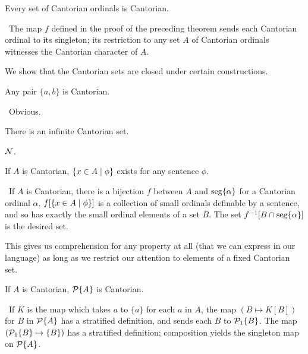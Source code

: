 \begin{thm}
 Every set of Cantorian ordinals is Cantorian.
\end{thm}

\preuve\ The map $f$ defined in the proof of the preceding
theorem sends each Cantorian ordinal to its
singleton; its restriction to any set $A$ of Cantorian
ordinals witnesses the Cantorian
character of $A$.
\finpreuve

We show that the Cantorian sets are closed under certain
constructions.

\begin{thm}
 Any pair $\{a,b\}$ is Cantorian.
\end{thm}

\preuve\ Obvious.
\finpreuve

\begin{thm}
 There is an infinite Cantorian set.
\end{thm}

\preuve ${\cal N}$.
\finpreuve

\begin{thm}
 If $A$ is Cantorian, $\{x \in A \mid \phi\}$ exists for any sentence $\phi$.
\end{thm}

\preuve\ If $A$ is Cantorian, there is a bijection $f$
between $A$ and $\mathop{\mathrm{seg}}\{\alpha\}$ 
for a Cantorian ordinal $\alpha$.  $f[\{x \in A \mid
\phi\}]$ is a collection of small ordinals definable by
a sentence, and so has exactly the small ordinal elements of a set $B$.  The
set $f^{-1}[B \cap \mathop{\mathrm{seg}}\{\alpha\}]$ is the desired set.
\finpreuve

This gives us comprehension for any property at all (that
we can express in our language) as long as we restrict our attention to
elements of a fixed Cantorian set.

\begin{thm}
 If $A$ is Cantorian, ${\cal P}\{A\}$ is Cantorian.
\end{thm}

\preuve\ If $K$ is the map which takes $a$ to $\{a\}$ for each $a$ in $A$, the
map $(B \mapsto  K[B])$ for $B$ in ${\cal P}\{A\}$ has a
stratified definition, and sends each 
$B$ to ${\cal P}_1\{B\}$.  The map $({\cal P}_1\{B\} \mapsto  \{B\})$ has a
stratified definition; 
composition yields the singleton
map on ${\cal P}\{A\}$.
\finpreuve

